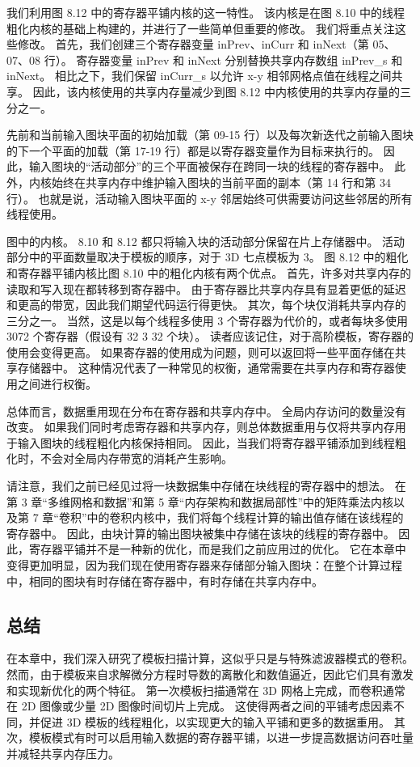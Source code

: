 我们利用图 8.12 中的寄存器平铺内核的这一特性。 该内核是在图 8.10 中的线程粗化内核的基础上构建的，并进行了一些简单但重要的修改。 我们将重点关注这些修改。 首先，我们创建三个寄存器变量 inPrev、inCurr 和 inNext（第 05、07、08 行）。 寄存器变量 inPrev 和 inNext 分别替换共享内存数组 inPrev\_s 和 inNext。 相比之下，我们保留 inCurr\_s 以允许 x-y 相邻网格点值在线程之间共享。 因此，该内核使用的共享内存量减少到图 8.12 中内核使用的共享内存量的三分之一。

先前和当前输入图块平面的初始加载（第 09-15 行）以及每次新迭代之前输入图块的下一个平面的加载（第 17-19 行）都是以寄存器变量作为目标来执行的。 因此，输入图块的“活动部分”的三个平面被保存在跨同一块的线程的寄存器中。 此外，内核始终在共享内存中维护输入图块的当前平面的副本（第 14 行和第 34 行）。 也就是说，活动输入图块平面的 x-y 邻居始终可供需要访问这些邻居的所有线程使用。

图中的内核。 8.10 和 8.12 都只将输入块的活动部分保留在片上存储器中。 活动部分中的平面数量取决于模板的顺序，对于 3D 七点模板为 3。 图 8.12 中的粗化和寄存器平铺内核比图 8.10 中的粗化内核有两个优点。 首先，许多对共享内存的读取和写入现在都转移到寄存器中。 由于寄存器比共享内存具有显着更低的延迟和更高的带宽，因此我们期望代码运行得更快。 其次，每个块仅消耗共享内存的三分之一。 当然，这是以每个线程多使用 3 个寄存器为代价的，或者每块多使用 3072 个寄存器（假设有 32 3 32 个块）。 读者应该记住，对于高阶模板，寄存器的使用会变得更高。 如果寄存器的使用成为问题，则可以返回将一些平面存储在共享存储器中。 这种情况代表了一种常见的权衡，通常需要在共享内存和寄存器使用之间进行权衡。

总体而言，数据重用现在分布在寄存器和共享内存中。 全局内存访问的数量没有改变。 如果我们同时考虑寄存器和共享内存，则总体数据重用与仅将共享内存用于输入图块的线程粗化内核保持相同。 因此，当我们将寄存器平铺添加到线程粗化时，不会对全局内存带宽的消耗产生影响。

请注意，我们之前已经见过将一块数据集中存储在块线程的寄存器中的想法。 在第 3 章“多维网格和数据”和第 5 章“内存架构和数据局部性”中的矩阵乘法内核以及第 7 章“卷积”中的卷积内核中，我们将每个线程计算的输出值存储在该线程的寄存器中。 因此，由块计算的输出图块被集中存储在该块的线程的寄存器中。 因此，寄存器平铺并不是一种新的优化，而是我们之前应用过的优化。 它在本章中变得更加明显，因为我们现在使用寄存器来存储部分输入图块：在整个计算过程中，相同的图块有时存储在寄存器中，有时存储在共享内存中。

\subsection{总结}
在本章中，我们深入研究了模板扫描计算，这似乎只是与特殊滤波器模式的卷积。 然而，由于模板来自求解微分方程时导数的离散化和数值逼近，因此它们具有激发和实现新优化的两个特征。 第一次模板扫描通常在 3D 网格上完成，而卷积通常在 2D 图像或少量 2D 图像时间切片上完成。 这使得两者之间的平铺考虑因素不同，并促进 3D 模板的线程粗化，以实现更大的输入平铺和更多的数据重用。 其次，模板模式有时可以启用输入数据的寄存器平铺，以进一步提高数据访问吞吐量并减轻共享内存压力。